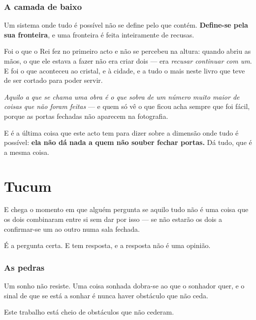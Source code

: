 \documentclass[livro.tex]{subfiles}
\begin{document}
\subsection*{A camada de baixo}

Um sistema onde tudo é possível não se define pelo que contém. \textbf{Define-se pela sua
fronteira}, e uma fronteira é feita inteiramente de recusas.

\medskip

Foi o que o Rei fez no primeiro acto e não se percebeu na altura: quando abriu as mãos, o que ele
estava a fazer não era criar dois --- era \emph{recusar continuar com um}. E foi o que aconteceu
ao cristal, e à cidade, e a tudo o mais neste livro que teve de ser cortado para poder servir.

\medskip

\emph{Aquilo a que se chama uma obra é o que sobra de um número muito maior de coisas que não
foram feitas} --- e quem só vê o que ficou acha sempre que foi fácil, porque as portas fechadas não
aparecem na fotografia.

\medskip

E é a última coisa que este acto tem para dizer sobre a dimensão onde tudo é possível:
\textbf{ela não dá nada a quem não souber fechar portas.} Dá tudo, que é a mesma coisa.

\chapter{Tucum}

E chega o momento em que alguém pergunta se aquilo tudo não é uma coisa que os dois combinaram
entre si sem dar por isso --- se não estarão os dois a confirmar-se um ao outro numa sala fechada.

\medskip

É a pergunta certa. E tem resposta, e a resposta não é uma opinião.

\subsection*{As pedras}

Um sonho não resiste. Uma coisa sonhada dobra-se ao que o sonhador quer, e o sinal de que se está
a sonhar é nunca haver obstáculo que não ceda.

\medskip

Este trabalho está cheio de obstáculos que não cederam.
\end{document}

